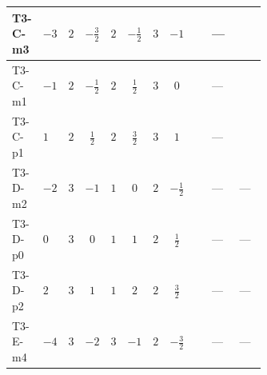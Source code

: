 \documentclass[8pt]{article}
\begin{document}
\begin{landscape}
\begin{longtable}{@{}llcccccc >{\raggedright\arraybackslash}p{0.21\linewidth} >{\raggedright\arraybackslash}p{0.21\linewidth} >{\raggedright\arraybackslash}p{0.21\linewidth}@{}}
\midrule
T3-C-m3 & $-3$ & $2$ & $-\frac{3}{2}$ & $2$ & $-\frac{1}{2}$ & $3$ & $-1$ & \scriptsize\adjustbox{max width=\linewidth}{$\begin{gathered} +4 {\lambda_{HS_2}^{(1)}} {\lambda_5}\end{gathered}$} & --- & \scriptsize\adjustbox{max width=\linewidth}{$\begin{gathered} -9 {g_2}^2 {\lambda_5}\end{gathered}$} \\
\midrule
T3-C-m1 & $-1$ & $2$ & $-\frac{1}{2}$ & $2$ & $\frac{1}{2}$ & $3$ & $0$ & \scriptsize\adjustbox{max width=\linewidth}{$\begin{gathered} +4 {\lambda_{HS_2}^{(1)}} {\lambda_5}\end{gathered}$} & --- & \scriptsize\adjustbox{max width=\linewidth}{$\begin{gathered} -9 {g_2}^2 {\lambda_5}\end{gathered}$} \\
\midrule
T3-C-p1 & $1$ & $2$ & $\frac{1}{2}$ & $2$ & $\frac{3}{2}$ & $3$ & $1$ & \scriptsize\adjustbox{max width=\linewidth}{$\begin{gathered} +4 {\lambda_{HS_2}^{(1)}} {\lambda_5}\end{gathered}$} & --- & \scriptsize\adjustbox{max width=\linewidth}{$\begin{gathered} -9 {g_2}^2 {\lambda_5}\end{gathered}$} \\
\midrule
T3-D-m2 & $-2$ & $3$ & $-1$ & $1$ & $0$ & $2$ & $-\frac{1}{2}$ & \scriptsize\adjustbox{max width=\linewidth}{$\begin{gathered} +4 {\lambda_{HS_2}^{(1)}} {\lambda_5}\end{gathered}$} & --- & --- \\
\midrule
T3-D-p0 & $0$ & $3$ & $0$ & $1$ & $1$ & $2$ & $\frac{1}{2}$ & \scriptsize\adjustbox{max width=\linewidth}{$\begin{gathered} +4 {\lambda_{HS_2}^{(1)}} {\lambda_5}\end{gathered}$} & --- & --- \\
\midrule
T3-D-p2 & $2$ & $3$ & $1$ & $1$ & $2$ & $2$ & $\frac{3}{2}$ & \scriptsize\adjustbox{max width=\linewidth}{$\begin{gathered} +4 {\lambda_{HS_2}^{(1)}} {\lambda_5}\end{gathered}$} & --- & --- \\
\midrule
T3-E-m4 & $-4$ & $3$ & $-2$ & $3$ & $-1$ & $2$ & $-\frac{3}{2}$ & \scriptsize\adjustbox{max width=\linewidth}{$\begin{gathered} +4 {\lambda_{HS_2}^{(1)}} {\lambda_5}\end{gathered}$} & --- & --- \\

\end{longtable}
\end{landscape}
\end{document}
